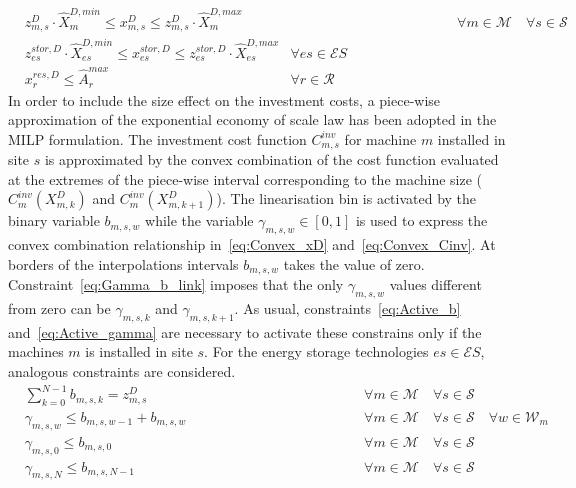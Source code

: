 \documentclass{article}
\newcommand{\cM}{{\mathcal M}}
\newcommand{\cS}{{\mathcal S}}
\newcommand{\cR}{{\mathcal R}}
\newcommand{\cES}{{\mathcal ES}}
\newcommand{\cW}{{\mathcal W}}
\begin{document}
{		\begin{align}
		& z_{m,s}^D \cdot \hat{X}_{m}^{D, min} \leq x_{m,s}^D \leq z_{m,s}^D \cdot \hat{X}_{m}^{D, max} &\hspace{5cm} \forall m \in \cM \quad \forall s \in \cS \label{eq:Size_lim} \\
		& z_{es}^{stor,D} \cdot \hat{X}_{es}^{D, min} \leq x_{es}^{stor,D} \leq z_{es}^{stor,D} \cdot \hat{X}_{es}^{D, max} & \forall es \in \cES \label{eq:Size_stor_max} \\
		& x_r^{res, D} \leq \hat{A}_r^{max} & \forall r \in \cR \label{eq:MaxArea_available}
		\end{align}
In order to include the size effect on the investment costs, a piece-wise approximation of the exponential economy of scale law has been adopted in the MILP formulation. The investment cost function $C_{m,s}^{inv}$ for machine $m$ installed in site $s$ is approximated by the convex combination of the cost function evaluated at the extremes of the piece-wise interval corresponding to the machine size ($C_{m}^{inv}(X_{m,k}^D)$ and $C_{m}^{inv}(X_{m,k+1}^D)$). 
The linearisation bin is activated by the binary variable $b_{m,s,w}$ while the variable $\gamma_{m,s,w} \in [0,1]$ is used to express the convex combination relationship in~\eqref{eq:Convex_xD} and~\eqref{eq:Convex_Cinv}. 
At borders of the interpolations intervals $b_{m,s,w}$ takes the value of zero. Constraint~\eqref{eq:Gamma_b_link} imposes that the only $\gamma_{m,s,w}$ values different from zero can be $\gamma_{m,s,k}$ and $\gamma_{m,s,k+1}$. As usual, constraints~\eqref{eq:Active_b} and~\eqref{eq:Active_gamma} are necessary to activate these constrains only if the machines $m$ is installed in site $s$. For the energy storage technologies $es \in \cES$, analogous constraints are considered. 
		\begin{align}
		& \sum_{ k = 0 }^{N-1} b_{m,s,k} = z_{m,s}^D & \hspace{5cm} \forall m \in \cM \quad \forall s \in \cS \label{eq:Active_b}\\
		& \gamma_{m,s,w} \leq b_{m,s,w-1} + b_{m,s,w}  & \hspace{5cm} \forall m \in \cM \quad \forall s \in \cS \quad \forall w \in \cW_m \label{eq:Gamma_b_link}\\
		& \gamma_{m,s,0} \leq b_{m,s,0}  & \hspace{5cm} \forall m \in \cM \quad \forall s \in \cS \label{eq:Gamma_b_zero}\\
		& \gamma_{m,s,N} \leq b_{m,s,N-1}  & \hspace{5cm} \forall m \in \cM \quad \forall s \in \cS \label{eq:Gamma_b_n}\\

\end{align}}
\end{document}
